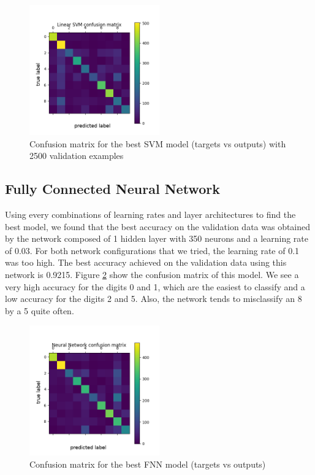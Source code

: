 \documentclass[letterpaper, 10 pt, conference]{ieeeconf}  %
\begin{document}
\begin{figure}[h]
	\begin{center}
			\includegraphics[width=0.5\textwidth]{figures/svm_conf.png}  %
		\caption{Confusion matrix for the best SVM model (targets vs outputs) with 2500 validation examples}
		\label{fig:svmconf}
	\end{center}
\end{figure}


\subsection{Fully Connected Neural Network}
Using every combinations of learning rates and layer architectures to find the best model, we found that the best accuracy on the validation data was obtained by the network composed of 1 hidden layer with 350 neurons and a learning rate of 0.03. For both network configurations that we tried, the learning rate of 0.1 was too high. The best accuracy achieved on the validation data using this network is 0.9215. Figure \ref{fig:fnnconf} show the confusion matrix of this model. We see a very high accuracy for the digits 0 and 1, which are the easiest to classify and a low accuracy for the digits 2 and 5. Also, the network tends to misclassify an 8 by a 5 quite often.

\begin{figure}[h]
	\begin{center}
			\includegraphics[width=0.5\textwidth]{figures/fnn_conf.png}  %
		\caption{Confusion matrix for the best FNN model (targets vs outputs)}
		\label{fig:fnnconf}
	\end{center}
\end{figure}
\end{document}
